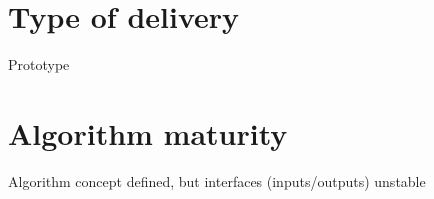 \documentclass[a4paper, oneside, 11pt, article, english]{memoir}
\begin{document}
\section{Type of delivery}
\label{sec:delivery}

Prototype

\iffalse
{
  \itshape

  The algorithms which are specified for the pipeline can come in different
  shapes and forms. We expect that the specifications will be delivered to the
  PDC under different forms, accordingly. Please indicate which one applies to
  the specified algorithm:

  \begin{itemize}
    \firmlist
  \item a legacy code. In that case, please contact WP12 office because some
    quality requirements are needed.
  \item a prototype. In that case, and in the first version of this document, no
    pseudo-code is to be provided.
  \item a pseudo-code. If no prototype exists, a workflow describing the
    algorithm main steps and a detailed pseudo-code is needed for
    implementation.
  \end{itemize}
}
\fi


\section{Algorithm maturity}
\label{sec:mature}

Algorithm concept defined, but interfaces (inputs/outputs) unstable

\iffalse
{
  \itshape

  Please specify the maturity level of the algorithm and do not hesitate to
  provide any further information on the current status of the algorithm. The
  convention for algorithm maturity is defined as:

  \begin{itemize}
    \firmlist
  \item algorithm not defined
  \item algorithm concept defined, but interfaces (inputs/outputs) unstable
  \item algorithm concept defined and interfaces (inputs/outputs) stable, but
    not all processing steps stable
  \item no change or only minor changes expected
  \end{itemize}

}
\fi
\end{document}
